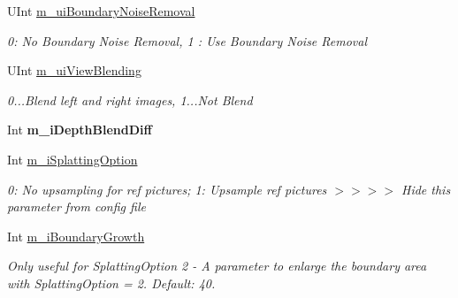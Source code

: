 \begin{DoxyCompactItemize}
\mbox{\label{class_c_parameter_view_interpolation_aacad961a78b8dab393e9e385e5f1eeee}} 
U\+Int \hyperlink{class_c_parameter_view_interpolation_aacad961a78b8dab393e9e385e5f1eeee}{m\+\_\+ui\+Boundary\+Noise\+Removal}
\begin{DoxyCompactList}\small\item\em 0\+: No Boundary Noise Removal, 1 \+: Use Boundary Noise Removal \end{DoxyCompactList}\item 
\mbox{\label{class_c_parameter_view_interpolation_a2876465469dc187e2ac703e733381f7f}} 
U\+Int \hyperlink{class_c_parameter_view_interpolation_a2876465469dc187e2ac703e733381f7f}{m\+\_\+ui\+View\+Blending}
\begin{DoxyCompactList}\small\item\em 0...Blend left and right images, 1...Not Blend \end{DoxyCompactList}\item 
\mbox{\label{class_c_parameter_view_interpolation_a6701ba1cbec2c6356b1dea1151d37ad1}} 
Int {\bfseries m\+\_\+i\+Depth\+Blend\+Diff}
\item 
Int \hyperlink{class_c_parameter_view_interpolation_a3ff171b45e1997dc6f76db0d40c46be7}{m\+\_\+i\+Splatting\+Option}
\begin{DoxyCompactList}\small\item\em 0\+: No upsampling for ref pictures; 1\+: Upsample ref pictures $>$$>$$>$$>$ Hide this parameter from config file \end{DoxyCompactList}\item 
\mbox{\label{class_c_parameter_view_interpolation_a933ad70892d8289076aa30a9f87f8366}} 
Int \hyperlink{class_c_parameter_view_interpolation_a933ad70892d8289076aa30a9f87f8366}{m\+\_\+i\+Boundary\+Growth}
\begin{DoxyCompactList}\small\item\em Only useful for Splatting\+Option 2 -\/ A parameter to enlarge the boundary area with Splatting\+Option = 2. Default\+: 40. \end{DoxyCompactList}\item 
\mbox{\label{class_c_parameter_view_interpolation_a5a3654fe382b2d4beeb0f2c1c0676b4b}} 

\end{DoxyCompactItemize}
